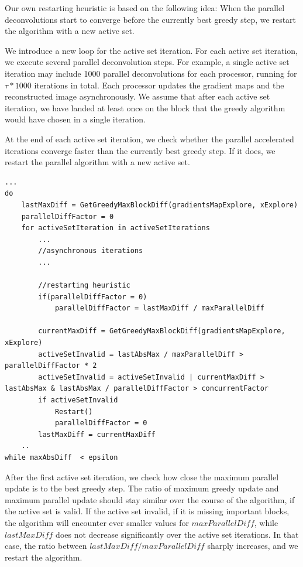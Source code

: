 Our own restarting heuristic is based on the following idea: When the parallel deconvolutions start to converge before the currently best greedy step, we restart the algorithm with a new active set.

We introduce a new loop for the active set iteration. For each active set iteration, we execute several parallel deconvolution steps. For example, a single active set iteration may include 1000 parallel deconvolutions for each processor, running for $\tau * 1000$ iterations in total. Each processor updates the gradient maps and the reconstructed image asynchronously. We assume that after each active set iteration, we have landed at least once on the block that the greedy algorithm would have chosen in a single iteration.

At the end of each active set iteration, we check whether the parallel accelerated iterations converge faster than the currently best greedy step. If it does, we restart the parallel algorithm with a new active set.

\begin{lstlisting}
...
do
	lastMaxDiff = GetGreedyMaxBlockDiff(gradientsMapExplore, xExplore)
	parallelDiffFactor = 0
	for activeSetIteration in activeSetIterations
		...
		//asynchronous iterations
		...
			
		//restarting heuristic
		if(parallelDiffFactor = 0)
			parallelDiffFactor = lastMaxDiff / maxParallelDiff
		
		currentMaxDiff = GetGreedyMaxBlockDiff(gradientsMapExplore, xExplore)
		activeSetInvalid = lastAbsMax / maxParallelDiff > parallelDiffFactor * 2
		activeSetInvalid = activeSetInvalid | currentMaxDiff > lastAbsMax & lastAbsMax / parallelDiffFactor > concurrentFactor
		if activeSetInvalid
			Restart()
			parallelDiffFactor = 0
		lastMaxDiff = currentMaxDiff
	..
while maxAbsDiff  < epsilon
\end{lstlisting}

After the first active set iteration, we check how close the maximum parallel update is to the best greedy step. The ratio of maximum greedy update and maximum parallel update should stay similar over the course of the algorithm, if the active set is valid. If the active set invalid, if it is missing important blocks, the algorithm will encounter ever smaller values for $maxParallelDiff$, while $lastMaxDiff$ does not decrease significantly over the active set iterations. In that case, the ratio between $lastMaxDiff / maxParallelDiff$ sharply increases, and we restart the algorithm.

